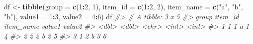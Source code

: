 \documentclass[
]{book}
\newenvironment{Shaded}{\begin{snugshade}}{\end{snugshade}}
\newcommand{\AttributeTok}[1]{\textcolor[rgb]{0.13,0.29,0.53}{#1}}
\newcommand{\CommentTok}[1]{\textcolor[rgb]{0.56,0.35,0.01}{\textit{#1}}}
\newcommand{\DecValTok}[1]{\textcolor[rgb]{0.00,0.00,0.81}{#1}}
\newcommand{\FunctionTok}[1]{\textcolor[rgb]{0.13,0.29,0.53}{\textbf{#1}}}
\newcommand{\NormalTok}[1]{#1}
\newcommand{\OtherTok}[1]{\textcolor[rgb]{0.56,0.35,0.01}{#1}}
\newcommand{\SpecialCharTok}[1]{\textcolor[rgb]{0.81,0.36,0.00}{\textbf{#1}}}
\newcommand{\StringTok}[1]{\textcolor[rgb]{0.31,0.60,0.02}{#1}}
\begin{document}
\begin{Shaded}
\begin{Highlighting}[]
\NormalTok{df }\OtherTok{\textless{}{-}} \FunctionTok{tibble}\NormalTok{(}\AttributeTok{group =} \FunctionTok{c}\NormalTok{(}\DecValTok{1}\SpecialCharTok{:}\DecValTok{2}\NormalTok{, }\DecValTok{1}\NormalTok{),}
             \AttributeTok{item\_id =} \FunctionTok{c}\NormalTok{(}\DecValTok{1}\SpecialCharTok{:}\DecValTok{2}\NormalTok{, }\DecValTok{2}\NormalTok{),}
             \AttributeTok{item\_name =} \FunctionTok{c}\NormalTok{(}\StringTok{"a"}\NormalTok{, }\StringTok{"b"}\NormalTok{, }\StringTok{"b"}\NormalTok{),}
             \AttributeTok{value1 =} \DecValTok{1}\SpecialCharTok{:}\DecValTok{3}\NormalTok{,}
             \AttributeTok{value2 =} \DecValTok{4}\SpecialCharTok{:}\DecValTok{6}\NormalTok{)}
\NormalTok{df}
\CommentTok{\#\textgreater{} \# A tibble: 3 x 5}
\CommentTok{\#\textgreater{}   group item\_id item\_name value1 value2}
\CommentTok{\#\textgreater{}   \textless{}dbl\textgreater{}   \textless{}dbl\textgreater{} \textless{}chr\textgreater{}      \textless{}int\textgreater{}  \textless{}int\textgreater{}}
\CommentTok{\#\textgreater{} 1     1       1 a              1      4}
\CommentTok{\#\textgreater{} 2     2       2 b              2      5}
\CommentTok{\#\textgreater{} 3     1       2 b              3      6}
  

\end{Highlighting}
\end{Shaded}
\end{document}
